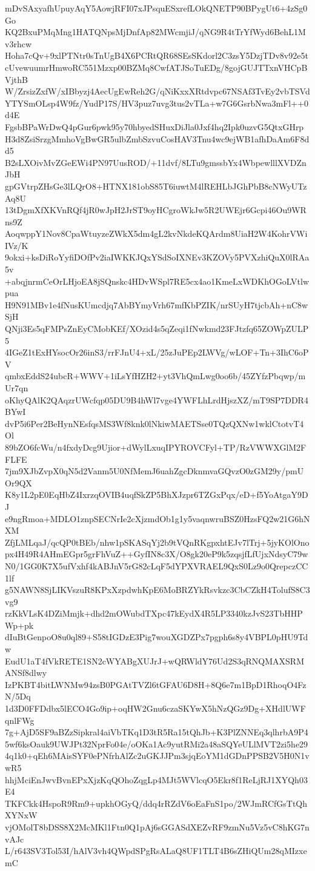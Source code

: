 mDvSAxyafhUpuyAqY5AowjRFI07xJPsquESxrefLOkQNETP90BPygUt6+4zSg0Go
KQ2BxuPMqMng1HATQNpsMjDnfAp82MWcmjiJ/qNG9R4tTrYfWyd6BehL1Mv3rhcw
Hoha7cQv+9xlPTNtr0sTnUgB4X6PCRtQR68SEsSKdorl2C3zsY5DzjTDv8v92e5t
cUvewuumrHmwoRC551Mzxp00BZMq8CwfATJSoTuEDg/8gojGUJTTxnVHCpBVjthB
W/ZrsizZxfW/xIBbyzj4AecUgEwReh2G/qNiKxxXRtdvpc67NSAf3TvEy2vbTSVd
YTYSmOLsp4W9fz/YudP17S/HV3puz7uvg3tus2vTLa+w7G6GsrbNwa3mFl++0d4E
FgsbBPaWrDwQ4pGur6pwk95y70hbyedSHuxDiJla0Jxf4hq2Ipk0uzvG5QtxGHrp
H3d8ZsiSrzgMmhoVgBwGR5ulbZmbSzvuCosHAV3Tnu4wc9ejWB1afhDaAm6F8dd5
B2sLXOivMvZGeEWi4PN97UusROD/+11dvf/8LTu9gmssbYx4WbpewlllXVDZnJbH
gpGVtrpZHsGe3lLQrO8+HTNX181obS85T6iuwtM4lREHLbJGhPbB8cNWyUTzAq8U
13tDgmXfXKVnRQf4jR0wJpH2JrST9oyHCgroWkJw5R2UWEjr6Gcpi46Ou9WRns9Z
AoqwppY1Nov8CpaWtuyzeZWkX5dm4gL2kvNkdeKQArdm8UiaH2W4KohrVWiIVz/K
9okxi+ksDiRoYyfiDOfPv2iaIWKKJQxYSdSoIXNEv3KZOVy5PVXzhiQuX0lRAa5v
+abqjnrmCeOrLHjoEA8jSQnskc4HDvWSpl7RE5cx4ao1KmeLxWDKhOGoLVtlwpua
H9N91MBv1e4fNusKUmcdjq7AbBYmyVrh67mfKbPZIK/nrSUyH7tjcbAh+nC8wSjH
QNji3Es5qFMPsZnEyCMobKEf/XOzid4s5qZeqi1fNwkmd23FJtzfq65ZOWpZULP5
4IGeZ1tExHYsocOr26inS3/rrFJnU4+xL/25zJuPEp2LWVg/wLOF+Tn+3IhC6oPV
qmbxEddS24ubcR+WWV+1iLsYfHZH2+yt3VhQmLwg0oo6b/45ZYfzPbqwp/mUr7qn
oKhyQAlK2QAqzrUWcfqp05DU9B4hWl7vge4YWFLhLrdHjszXZ/mT9SP7DDR4BYwI
dvP5i6Per2BeHynNEsfqsMS3Wf8knk0lNkiwMAETSse0TQzQXNw1wklCtotvT4Ol
89bZO6fcWu/n4fxdyDcg9Ujior+dWylLxuqIPYROVCFyl+TP/RzVWWXGlM2FFLFE
7jm9XJbZvpX0qN5d2Vanm5U0NfMemJ6uahZgcDknmvaGQvzO0zGM29y/pmUOr9QX
K8y1L2pE0EqHbZ4IxrzqOVIB4uqfSkZP5BhXJzpr6TZGxPqx/eD+f5YoAtgaY9DJ
e9ngRmoa+MDLO1znpSECNrIe2cXjzmdOb1g1y5vaqnwruBSZ0HzsFQ2w21G6hNXM
ZfjLMLqaJ/qcQP0tBEb/nhw1pSKASqYj2b9tVQnRKgpxhtEJv7lTrj+5jyKOlOno
px4H49R4AHmEGpr5grFhVuZ++GyfIN8c3X/O8gk20eP9k5zqsjfLfUjxNdsyC79w
N0/1GG0K7X5ufVxhf4kABJnV5rG82cLqF5dYPXVRAEL9QxS0Lz9o0QrepczCC1lf
g5NAWN8SjLIKVszuR8KPxXzpdwhKpE6MoBRZYkRsvkzc3CbCZkH4TolufS8C3vg9
rzKkVLsK4DZiMmjk+dhd2mOWubdTXpc47kEydX4R5LP3340kzJvS23TbHHPWp+pk
dIuBtGenpoO8u0ql89+S58tIGDzE3Pig7wouXGDZPx7pgph6s8y4VBPL0pHU9Tdw
EudU1aT4fVkRETE1SN2cWYABgXUJrJ+wQRWldY76Ud2S3qRNQMAXSRMANSf8dlwy
IzPKBT4bitLWNMw94zsB0PGAtTVZl6tGFAU6D8H+8Q6e7m1BpD1RhoqO4FzN/5Dq
1d3D0FFDdbx5lECO4Go9ip+oqHW2Gnu6czaSKYwX5hNzQGz9Dg+XHdlUWFqnlFWg
7g+AjD5SF9aBZzSipkral4aiVbTKq1D3tR5Ra15tQhJb+K3PlZNNEq3qlhrbA9P4
5wf6ksOauk9UWJPt32NprFo04e/oOKa1Ac9yutRMi2a48aSQYeULlMVT2zi5he29
4q1k0+qEh6MAisSYF0ePNfrhAlZc2uGKJJPm3sjqEoYM1dGDnPPSB2V5H0N1vwR5
hhjMciEnJwvBvnEPxXjzKqQOhoZqgLp4MJt5WVlcqO5Ekr8f1ReLjRJ1XYQh03E4
TKFCkk4HspoR9Rm9+upkhOGyQ/ddq4rRZdV6oEaFnS1po/2WJmRCfGsTtQhXYNxW
vjOMolT8bDSS8X2McMKl1Ftn0Q1pAj6sGGASdXEZvRF9zmNu5Vz5vC8hKG7nvAJc
L/r643SV3Tol53I/hAlV3vh4QWpdSPgRsALaQ8UF1TLT4B6sZHiQUm28qMIzxemC
